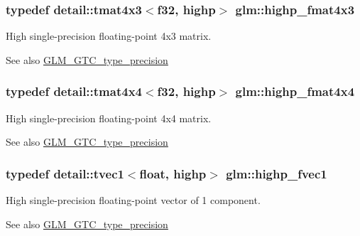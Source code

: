 \subsubsection[{\texorpdfstring{highp\+\_\+fmat4x3}{highp_fmat4x3}}]{\setlength{\rightskip}{0pt plus 5cm}typedef detail\+::tmat4x3$<$f32, highp$>$ {\bf glm\+::highp\+\_\+fmat4x3}}\hypertarget{group__gtc__type__precision_ga07f7578fc5a4dd8cdd8a532db25d535f}{}\label{group__gtc__type__precision_ga07f7578fc5a4dd8cdd8a532db25d535f}
High single-\/precision floating-\/point 4x3 matrix. \begin{DoxySeeAlso}{See also}
\hyperlink{group__gtc__type__precision}{G\+L\+M\+\_\+\+G\+T\+C\+\_\+type\+\_\+precision} 
\end{DoxySeeAlso}
\subsubsection[{\texorpdfstring{highp\+\_\+fmat4x4}{highp_fmat4x4}}]{\setlength{\rightskip}{0pt plus 5cm}typedef detail\+::tmat4x4$<$f32, highp$>$ {\bf glm\+::highp\+\_\+fmat4x4}}\hypertarget{group__gtc__type__precision_gaf0a98d6caffce89da963d3430e05ddb0}{}\label{group__gtc__type__precision_gaf0a98d6caffce89da963d3430e05ddb0}
High single-\/precision floating-\/point 4x4 matrix. \begin{DoxySeeAlso}{See also}
\hyperlink{group__gtc__type__precision}{G\+L\+M\+\_\+\+G\+T\+C\+\_\+type\+\_\+precision} 
\end{DoxySeeAlso}
\subsubsection[{\texorpdfstring{highp\+\_\+fvec1}{highp_fvec1}}]{\setlength{\rightskip}{0pt plus 5cm}typedef detail\+::tvec1$<$float, highp$>$ {\bf glm\+::highp\+\_\+fvec1}}\hypertarget{group__gtc__type__precision_ga5d9f2208253856df60a57925f92ff0c8}{}\label{group__gtc__type__precision_ga5d9f2208253856df60a57925f92ff0c8}
High single-\/precision floating-\/point vector of 1 component. \begin{DoxySeeAlso}{See also}
\hyperlink{group__gtc__type__precision}{G\+L\+M\+\_\+\+G\+T\+C\+\_\+type\+\_\+precision} 
\end{DoxySeeAlso}

